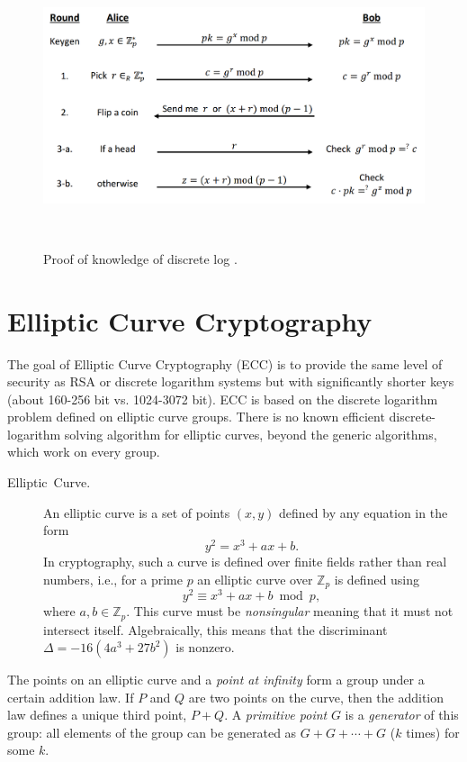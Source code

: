 \documentclass[11pt]{article}
\theoremstyle{plain}
\begin{document}
\begin{figure}
	\begin{description}
		\item [{\includegraphics[scale=0.5]{cev-zkp}}]~
	\end{description}
	\caption{Proof of knowledge of discrete log \cite{Chaum:87:ZKP}.}
	\label{fig:CEG-ZKP}
\end{figure}


\section{Elliptic Curve Cryptography}

The goal of Elliptic Curve Cryptography (ECC) is to provide the same
level of security as RSA or discrete logarithm systems but with significantly
shorter keys (about 160-256 bit vs. 1024-3072 bit). ECC is based on
the discrete logarithm problem defined on elliptic curve groups. There
is no known efficient discrete-logarithm solving algorithm for elliptic
curves, beyond the generic algorithms, which work on every group.
\begin{description}
	\item [{Elliptic~Curve.}] An elliptic curve is a set of points $(x,y)$
	defined by any equation in the form 
	\[
	y^{2}=x^{3}+ax+b.
	\]
	In cryptography, such a curve is defined over finite fields rather
	than real numbers, i.e., for a prime $p$ an elliptic curve over $\mathbb{Z}_{p}$
	is defined using 
	\[
	y^{2}\equiv x^{3}+ax+b\bmod{p},
	\]
	where $a,b\in\mathbb{Z}_{p}$. This curve must be \emph{nonsingular}
	meaning that it must not intersect itself. Algebraically, this means
	that the discriminant $\Delta=-16(4a^{3}+27b^{2})$ is nonzero.
\end{description}
The points on an elliptic curve and a \emph{point at infinity} form
a group under a certain addition law. If $P$ and $Q$ are two points
on the curve, then the addition law defines a unique third point,
$P+Q$. A \emph{primitive point} $G$ is a \emph{generator} of this
group: all elements of the group can be generated as $G+G+\cdots+G$
($k$ times) for some $k$.
\end{document}
